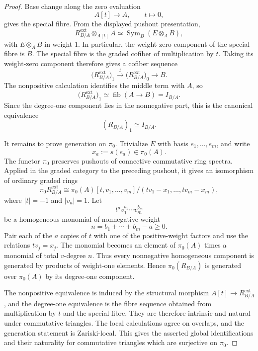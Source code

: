 \begin{proof}
Base change along the zero evaluation
\[
    A[t]\longrightarrow A,
    \qquad
    t\longmapsto0,
\]
gives the special fibre.  From the displayed pushout presentation,
\[
    R^{\mathrm{ext}}_{B/A}\otimes_{A[t]}A
    \simeq
    \operatorname{Sym}_B(E\otimes_AB),
\]
with \(E\otimes_AB\) in weight \(1\).  In particular, the weight-zero
component of the special fibre is \(B\).  The special fibre is the graded cofiber of multiplication by \(t\).
Taking its weight-zero component therefore gives a cofiber sequence
\[
    \bigl(R^{\mathrm{ext}}_{B/A}\bigr)_1
    \xrightarrow{t}
    \bigl(R^{\mathrm{ext}}_{B/A}\bigr)_0
    \longrightarrow
    B.
\]
The nonpositive calculation identifies the middle term with \(A\), so
\[
    \bigl(R^{\mathrm{ext}}_{B/A}\bigr)_1
    \simeq
    \operatorname{fib}(A\longrightarrow B)
    =
    I_{B/A}.
\]
Since the degree-one component lies in the nonnegative part, this is the
canonical equivalence
\[
    (R_{B/A})_1
    \simeq
    I_{B/A}.
\]

It remains to prove generation on \(\pi_0\).  Trivialize \(E\) with basis
\(e_1,\ldots,e_m\), and write
\[
    x_a:=s(e_a)\in\pi_0(A).
\]
The functor \(\pi_0\) preserves pushouts of connective commutative ring
spectra.  Applied in the graded category to the preceding pushout, it gives
an isomorphism of ordinary graded rings
\[
    \pi_0R^{\mathrm{ext}}_{B/A}
    \cong
    \pi_0(A)[t,v_1,\ldots,v_m]
    /
    (tv_1-x_1,\ldots,tv_m-x_m),
\]
where \(|t|=-1\) and \(|v_a|=1\).  Let
\[
    t^a v_1^{b_1}\cdots v_m^{b_m}
\]
be a homogeneous monomial of nonnegative weight
\[
    n=b_1+\cdots+b_m-a\geq0.
\]
Pair each of the \(a\) copies of \(t\) with one of the positive-weight
factors and use the relations \(tv_j=x_j\).  The monomial becomes an
element of \(\pi_0(A)\) times a monomial of total \(v\)-degree \(n\).
Thus every nonnegative homogeneous component is generated by products of
weight-one elements.  Hence \(\pi_0(R_{B/A})\) is generated over
\(\pi_0(A)\) by its degree-one component.

The nonpositive equivalence is induced by the structural morphism
\(A[t]\to R^{\mathrm{ext}}_{B/A}\), and the degree-one equivalence is the
fibre sequence obtained from multiplication by \(t\) and the special
fibre.  They are therefore intrinsic and natural under commutative
triangles.  The local calculations agree on overlaps, and the generation
statement is Zariski-local.  This gives the asserted global identifications
and their naturality for commutative triangles which are surjective on
\(\pi_0\).
\end{proof}

